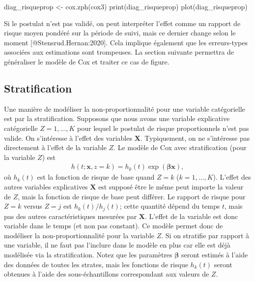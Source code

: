 \documentclass[
  11pt,
  letterpaper,
]{scrbook}
\newenvironment{Shaded}{\begin{snugshade}}{\end{snugshade}}
\newcommand{\FunctionTok}[1]{\textcolor[rgb]{0.28,0.35,0.67}{#1}}
\newcommand{\NormalTok}[1]{\textcolor[rgb]{0.00,0.23,0.31}{#1}}
\newcommand{\OtherTok}[1]{\textcolor[rgb]{0.00,0.23,0.31}{#1}}
\theoremstyle{definition}
\theoremstyle{remark}
\begin{document}
\begin{Shaded}
\begin{Highlighting}[]
\NormalTok{diag\_risqueprop }\OtherTok{\textless{}{-}} \FunctionTok{cox.zph}\NormalTok{(cox3)}
\FunctionTok{print}\NormalTok{(diag\_risqueprop)}
\FunctionTok{plot}\NormalTok{(diag\_risqueprop)}
\end{Highlighting}
\end{Shaded}

Si le postulat n'est pas validé, on peut interpréter l'effet comme un
rapport de risque moyen pondéré sur la période de suivi, mais ce dernier
change selon le moment {[}@Stensrud.Hernan:2020{]}. Cela implique
également que les erreurs-types associées aux estimations sont
trompeuses. La section suivante permettra de généraliser le modèle de
Cox et traiter ce cas de figure.

\hypertarget{stratification}{%
\subsection{Stratification}\label{stratification}}

Une manière de modéliser la non-proportionnalité pour une variable
catégorielle est par la stratification. Supposons que nous avons une
variable explicative catégorielle \(Z=1, \ldots, K\) pour lequel le
postulat de risque proportionnels n'est pas valide. On s'intéresse à
l'effet des variables \(\mathbf{X}\). Typiquement, on ne s'intéresse pas
directement à l'effet de la variable \(Z\). Le modèle de Cox avec
stratification (pour la variable \(Z\)) est \begin{align*}
h(t; \mathbf{x}, z=k) = h_k(t) \exp(\boldsymbol{\beta} \mathbf{x}),
\end{align*} où \(h_k(t)\) est la fonction de risque de base quand
\(Z=k\) (\(k=1, \ldots, K\)). L'effet des autres variables explicatives
\(\mathbf{X}\) est supposé être le même peut importe la valeur de \(Z\),
mais la fonction de risque de base peut différer. Le rapport de risque
pour \(Z=k\) versus \(Z=j\) est \(h_k(t)/h_j(t)\); cette quantité dépend
du temps \(t\), mais pas des autres caractéristiques mesurées par
\(\mathbf{X}\). L'effet de la variable est donc variable dans le temps
(et non pas constant). Ce modèle permet donc de modéliser la
non-proportionnalité pour la variable \(Z\). Si on stratifie par rapport
à une variable, il ne faut pas l'inclure dans le modèle en plus car elle
est déjà modélisée via la stratification. Notez que les paramètres
\(\boldsymbol{\beta}\) seront estimés à l'aide des données de toutes les
strates, mais les fonctions de risque \(h_k(t)\) seront obtenues à
l'aide des sous-échantillons correspondant aux valeurs de \(Z\).
\end{document}
